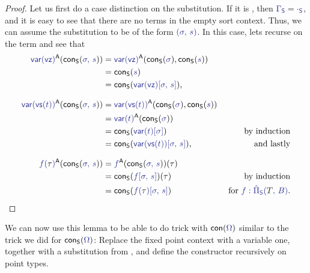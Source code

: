 \begin{proof}
Let us first do a case distinction on the substitution.
If it is \tqm{\epsilon}, then $\tqm{\Gamma_\Sc} = \tqm{\cdot_\Sc} $,
and it is easy to see that there are no terms in the empty sort context.
Thus, we can assume the substitution to be of the form $\tqm{(\sigma,\, s)}$.
In this case, lets recurse on the term and see that
\begin{align*}
\tqm{\var(\vz)}^\CC(\IFconS{\sigma,\, s})
  &= \tqm{\var(\vz)}^\CC(\IFconS{\sigma}, \IFconS{s}) \\
  &= \IFconS{s} \\
  &= \IFconS{\var(\vz)[\sigma,\, s]} \text{,} \\[.7em]
\tqm{\var(\vs(t))}^\CC(\IFconS{\sigma,\, s})
  &= \tqm{\var(\vs(t))}^\CC(\IFconS{\sigma}, \IFconS{s}) \\
  &= \tqm{\var(t)}^\CC(\IFconS{\sigma}) \\
  &= \IFconS{\var(t)[\sigma]} & \text{ by induction} \\
  &= \IFconS{\var(\vs(t))[\sigma,\, s]} \text, & \text{ and lastly} \\[.7em]
\tqm{f(\bltau)}^\CC(\IFconS{\sigma,\, s})
  &= \tqm{f}^\CC(\IFconS{\sigma,\, s})(\bltau) \\
  &= \IFconS{f[\sigma,\, s]}(\bltau) & \text{ by induction} \\
  &= \IFconS{f(\bltau)[\sigma,\, s]} & \text{ for \tqm{f : \ExtPiS{T}{B}}.}
\end{align*}
\end{proof}

We can now use this lemma to be able to do trick with $\IFcon{\Omega}$ similar
to the trick we did for $\IFconS{\Omega}$:
Replace the fixed point context with a variable one, together with a substitution
from \tqm{\Omega}, and define the constructor recursively on point types.

